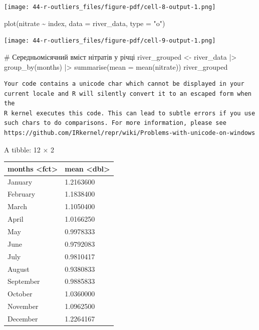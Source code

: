 \documentclass[
  letterpaper,
  DIV=11,
  numbers=noendperiod]{scrreprt}
\newenvironment{Shaded}{\begin{snugshade}}{\end{snugshade}}
\newcommand{\AttributeTok}[1]{\textcolor[rgb]{0.40,0.45,0.13}{#1}}
\newcommand{\CommentTok}[1]{\textcolor[rgb]{0.37,0.37,0.37}{#1}}
\newcommand{\FunctionTok}[1]{\textcolor[rgb]{0.28,0.35,0.67}{#1}}
\newcommand{\NormalTok}[1]{\textcolor[rgb]{0.00,0.23,0.31}{#1}}
\newcommand{\OtherTok}[1]{\textcolor[rgb]{0.00,0.23,0.31}{#1}}
\newcommand{\SpecialCharTok}[1]{\textcolor[rgb]{0.37,0.37,0.37}{#1}}
\newcommand{\StringTok}[1]{\textcolor[rgb]{0.13,0.47,0.30}{#1}}
\begin{document}
\texttt{[image: 44-r-outliers\_files/figure-pdf/cell-8-output-1.png]}

\begin{Shaded}
\begin{Highlighting}[]
\FunctionTok{plot}\NormalTok{(nitrate }\SpecialCharTok{\textasciitilde{}}\NormalTok{ index, }\AttributeTok{data =}\NormalTok{ river\_data, }\AttributeTok{type =} \StringTok{"o"}\NormalTok{)}
\end{Highlighting}
\end{Shaded}

\texttt{[image: 44-r-outliers\_files/figure-pdf/cell-9-output-1.png]}

\begin{Shaded}
\begin{Highlighting}[]
\CommentTok{\# Середньомісячний вміст нітратів у річці}
\NormalTok{river\_grouped }\OtherTok{\textless{}{-}}\NormalTok{ river\_data }\SpecialCharTok{|\textgreater{}} \FunctionTok{group\_by}\NormalTok{(months) }\SpecialCharTok{|\textgreater{}} \FunctionTok{summarise}\NormalTok{(}\AttributeTok{mean =} \FunctionTok{mean}\NormalTok{(nitrate))}
\NormalTok{river\_grouped }
\end{Highlighting}
\end{Shaded}

\begin{verbatim}
Your code contains a unicode char which cannot be displayed in your
current locale and R will silently convert it to an escaped form when the
R kernel executes this code. This can lead to subtle errors if you use
such chars to do comparisons. For more information, please see
https://github.com/IRkernel/repr/wiki/Problems-with-unicode-on-windows
\end{verbatim}

A tibble: 12 × 2

\begin{longtable}[]{@{}ll@{}}
\toprule\noalign{}
months \textless fct\textgreater{} & mean \textless dbl\textgreater{} \\
\midrule\noalign{}
\endhead
\bottomrule\noalign{}
\endlastfoot
January & 1.2163600 \\
February & 1.1838400 \\
March & 1.1050400 \\
April & 1.0166250 \\
May & 0.9978333 \\
June & 0.9792083 \\
July & 0.9810417 \\
August & 0.9380833 \\
September & 0.9885833 \\
October & 1.0360000 \\
November & 1.0962500 \\
December & 1.2264167 \\
\end{longtable}
\end{document}
